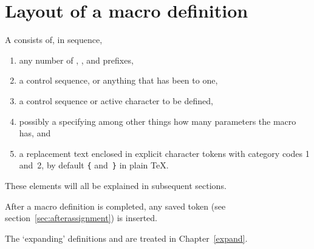 \section{Layout of a macro definition}

A  consists of, in sequence,
\begin{enumerate} \item any number of ,
, and  prefixes,
\item a  control sequence, or anything
that has been  to one,
\item a control sequence or active character to be defined, 
\item possibly a  specifying among other things
how many parameters the macro has, and
\item a replacement text enclosed in explicit character tokens
with category codes 1 and~2,
by default \verb-{- and~\verb-}-
in plain \TeX.
\end{enumerate}
These elements will all be explained in subsequent sections.

After a macro definition is completed, any saved 
token (see section~\ref{sec:afterassignment}) is inserted.

The `expanding' definitions  and 
are treated in Chapter~\ref{expand}.


